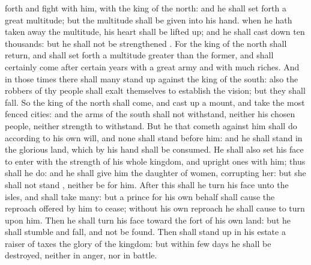{forth and
fight with him,
{} with the
king of the
north: and he shall set
forth a
great
multitude; but the
multitude shall be
given into his
hand.
 when he hath taken
away the
multitude, his
heart shall be lifted
up; and he shall cast
down
{} ten
thousands: but he shall not be
strengthened
{}.
For the
king of the
north shall
return, and shall set
forth a
multitude
greater than the
former, and shall
certainly
come
after
certain
years with a
great
army and with
much
riches.
And in those
times there shall
many stand
up against the
king of the
south: also the
robbers of thy
people shall
exalt themselves to
establish the
vision; but they shall
fall.
So the
king of the
north shall
come, and cast
up a
mount, and
take the most
fenced
cities: and the
arms of the
south shall not
withstand, neither his
chosen
people, neither
{}
strength to
withstand.
But he that
cometh against him shall
do according to his own
will, and none shall
stand
before him: and he shall
stand in the
glorious
land, which by his
hand shall be
consumed.
He shall also
set his
face to
enter with the
strength of his whole
kingdom, and upright
ones with him; thus shall he
do: and he shall
give him the
daughter of
women,
corrupting her: but she shall not
stand
{}, neither be for him.
After this shall he
turn his
face unto the
isles, and shall
take
many: but a
prince for his own behalf shall cause the
reproach offered by him to
cease;
without his own
reproach he shall cause
{} to
turn upon him.
Then he shall
turn his
face toward the
fort of his own
land: but he shall
stumble and
fall, and not be
found.
Then shall stand
up in his
estate a
raiser of
taxes
{} the
glory of the
kingdom: but within
few
days he shall be
destroyed, neither in
anger, nor in
battle.
}
